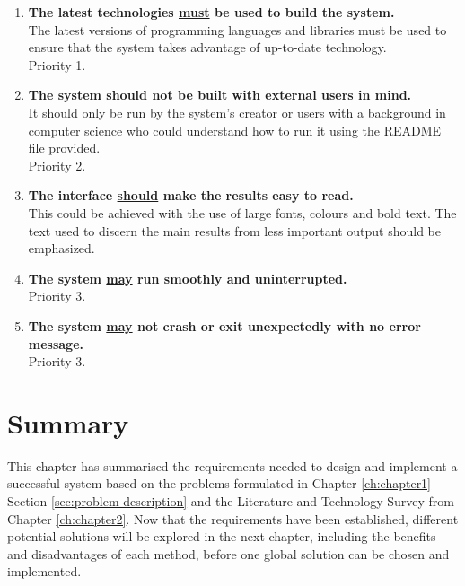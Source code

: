 \begin{enumerate}[label=NF\arabic*]

    \item \textbf{The latest technologies \underline{must} be used to build the system.}\\
    The latest versions of programming languages and libraries must be used to ensure that the system takes advantage of up-to-date technology.\\
    Priority 1.
    
    \item \textbf{The system \underline{should} not be built with external users in mind.}\\
    It should only be run by the system's creator or users with a background in computer science who could understand how to run it using the README file provided.\\
    Priority 2.

    \item \textbf{The interface \underline{should} make the results easy to read.}\\
    This could be achieved with the use of large fonts, colours and bold text. The text used to discern the main results from less important output should be emphasized.
    
    \item \textbf{The system \underline{may} run smoothly and uninterrupted.}\\
    Priority 3.
    
    \item \textbf{The system \underline{may} not crash or exit unexpectedly with no error message.}\\
    Priority 3.

\end{enumerate}

\section{Summary}

This chapter has summarised the requirements needed to design and implement a successful system based on the problems formulated in Chapter \ref{ch:chapter1} Section \ref{sec:problem-description} and the Literature and Technology Survey from Chapter \ref{ch:chapter2}. Now that the requirements have been established, different potential solutions will be explored in the next chapter, including the benefits and disadvantages of each method, before one global solution can be chosen and implemented.
